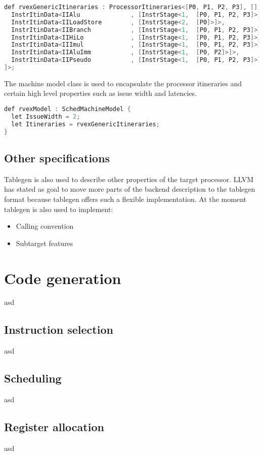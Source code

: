 \begin{lstlisting}[language=java] 
def rvexGenericItineraries : ProcessorItineraries<[P0, P1, P2, P3], [], [
  InstrItinData<IIAlu              , [InstrStage<1,  [P0, P1, P2, P3]>]>,
  InstrItinData<IILoadStore        , [InstrStage<2,  [P0]>]>,
  InstrItinData<IIBranch           , [InstrStage<1,  [P0, P1, P2, P3]>]>,
  InstrItinData<IIHiLo             , [InstrStage<1,  [P0, P1, P2, P3]>]>,
  InstrItinData<IIImul             , [InstrStage<1,  [P0, P1, P2, P3]>]>,
  InstrItinData<IIAluImm           , [InstrStage<1,  [P0, P2]>]>,
  InstrItinData<IIPseudo           , [InstrStage<1,  [P0, P1, P2, P3]>]>
]>;
\end{lstlisting}

The machine model class is used to encapsulate the processor itineraries and certain high level properties such as issue width and latencies.

\begin{lstlisting}[language=java] 
def rvexModel : SchedMachineModel {
  let IssueWidth = 2;
  let Itineraries = rvexGenericItineraries;
}
\end{lstlisting}

\subsection{Other specifications}
Tablegen is also used to describe other properties of the target processor. LLVM has stated as goal to move more parts of the backend description to the tablegen format because tablegen offers such a flexible implementation. At the moment tablegen is also used to implement:

\begin{itemize}
	\item Calling convention
	\item Subtarget features
\end{itemize}

\section{Code generation}
asd
\subsection{Instruction selection}
asd
\subsection{Scheduling}
asd
\subsection{Register allocation}
asd
